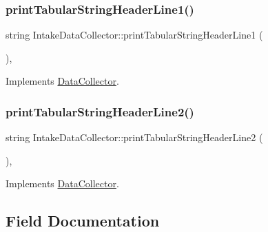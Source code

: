 \subsubsection{\texorpdfstring{print\+Tabular\+String\+Header\+Line1()}{printTabularStringHeaderLine1()}}
{\footnotesize\ttfamily string Intake\+Data\+Collector\+::print\+Tabular\+String\+Header\+Line1 (\begin{DoxyParamCaption}{ }\end{DoxyParamCaption})\hspace{0.3cm}{\ttfamily [override]}, {\ttfamily [virtual]}}



Implements \mbox{\hyperlink{classDataCollector_a91619cfa9e9b8cefd2f7c20d5718b41e_a91619cfa9e9b8cefd2f7c20d5718b41e}{Data\+Collector}}.

\mbox{\label{classIntakeDataCollector_a2855eb8eed71649309bd4d9336f258c0_a2855eb8eed71649309bd4d9336f258c0}} 
\subsubsection{\texorpdfstring{print\+Tabular\+String\+Header\+Line2()}{printTabularStringHeaderLine2()}}
{\footnotesize\ttfamily string Intake\+Data\+Collector\+::print\+Tabular\+String\+Header\+Line2 (\begin{DoxyParamCaption}{ }\end{DoxyParamCaption})\hspace{0.3cm}{\ttfamily [override]}, {\ttfamily [virtual]}}



Implements \mbox{\hyperlink{classDataCollector_af01ea961314be2164f39e6d4cd59e443_af01ea961314be2164f39e6d4cd59e443}{Data\+Collector}}.



\subsection{Field Documentation}
\mbox{\label{classIntakeDataCollector_a7d1d205c15423db421038e54ac0e1f36_a7d1d205c15423db421038e54ac0e1f36}} 
